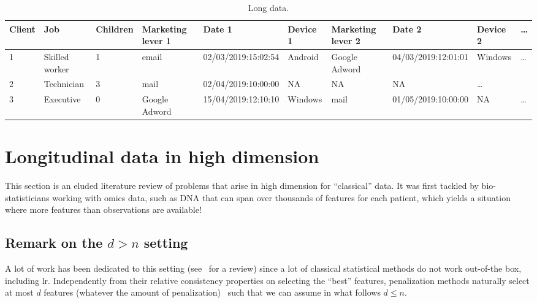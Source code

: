 \begin{table}[ht]
    \centering
    \caption{Long data.}
    \label{tab:example_longitudinal}
    \begin{tiny}
\begin{tabular}{llllllllll}
Client & Job & Children & Marketing lever 1 & Date 1 & Device 1 & Marketing lever 2 & Date 2 & Device 2 & \dots \\
 \hline
1 & Skilled worker & 1 & email & 02/03/2019:15:02:54 & Android & Google Adword & 04/03/2019:12:01:01 & Windows & \dots \\
2 & Technician & 3 & mail & 02/04/2019:10:00:00 & NA & NA & NA & \dots\\
3 & Executive & 0 & Google Adword & 15/04/2019:12:10:10 & Windows & mail & 01/05/2019:10:00:00 & NA & \dots \\
\end{tabular}
    \end{tiny}
\end{table}


\section{Longitudinal data in high dimension}

This section is an eluded literature review of problems that arise in high dimension for ``classical'' data. It was first tackled by bio-statisticians working with omics data, such as DNA that can span over thousands of features for each patient, which yields a situation where more features than observations are available!


\subsection{Remark on the $d > n$ setting}

A lot of work has been dedicated to this setting (see~\cite{buhlmann2011statistics} for a review) since a lot of classical statistical methods do not work out-of-the box, including \gls{lr}. Independently from their relative consistency properties on selecting the ``best'' features, penalization methods naturally select at most $d$ features (whatever the amount of penalization)~\cite{zhu2004classification} such that we can assume in what follows $d \leq n$.

